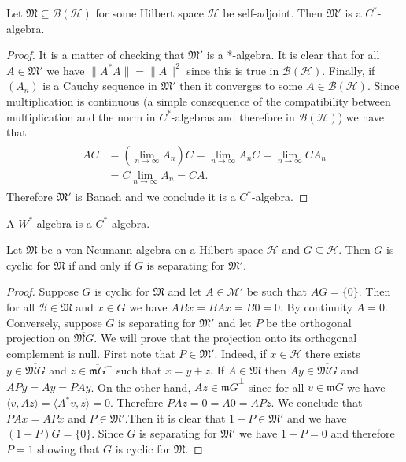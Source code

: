 \begin{theorem}
Let $\mathfrak{M}\subseteq \mathcal{B}({\mathcal{H}})$ for some Hilbert space $\mathcal{H}$ be self-adjoint. Then $\mathfrak{M}'$ is a $C^*$-algebra.
\end{theorem}

\begin{proof}
It is a matter of checking that $\mathfrak{M}'$ is a *-algebra. It is clear that for all $A\in\mathfrak{M}'$ we have $\|A^*A\|=\|A\|^2$ since this is true in $\mathcal{B}(\mathcal{H})$. Finally, if $(A_n)$ is a Cauchy sequence in $\mathfrak{M}'$ then it converges to some $A\in\mathcal{B}(\mathcal{H})$. Since multiplication is continuous (a simple consequence of the compatibility between multiplication and the norm in $C^*$-algebras and therefore in $\mathcal{B}(\mathcal{H})$) we have that
\begin{align}
\begin{split}
AC&=(\lim_{n\rightarrow\infty}A_n)C = \lim_{n\rightarrow\infty}A_nC=\lim_{n\rightarrow\infty}CA_n \\
&= C\lim_{n\rightarrow\infty}A_n=CA.
\end{split}
\end{align}
Therefore $\mathfrak{M}'$ is Banach and we conclude it is a $C^*$-algebra.
\end{proof}

\begin{corollary}\label{cor:W_C}
A $W^*$-algebra is a $C^*$-algebra.
\end{corollary}

\begin{theorem}
Let $\mathfrak{M}$ be a von Neumann algebra on a Hilbert space $\mathcal{H}$ and $G\subseteq\mathcal{H}$. Then $G$ is cyclic for $\mathfrak{M}$ if and only if $G$ is separating for $\mathfrak{M}'$.
\end{theorem}

\begin{proof}
Suppose $G$ is cyclic for $\mathfrak{M}$ and let $A\in\mathcal{M}'$ be such that $AG=\{0\}$. Then for all $\mathcal{B}\in\mathfrak{M}$ and $x\in G$ we have $ABx=BAx=B0=0$. By continuity $A=0$.
Conversely, suppose $G$ is separating for $\mathfrak{M}'$ and let $P$ be the orthogonal projection on $\overline{\mathfrak{M}G}$. We will prove that the projection onto its orthogonal complement is null. First note that $P\in\mathfrak{M}'$. Indeed, if $x\in\mathcal{H}$ there exists $y\in \overline{\mathfrak{M}G}$ and $z\in\overline{\mathfrak{m}G}^\bot$ such that $x=y+z$. If $A\in\mathfrak{M}$ then $Ay\in\overline{\mathfrak{M}G}$ and $APy=Ay=PAy$. On the other hand, $Az\in\overline{\mathfrak{m}G}^\bot$ since for all $v\in\overline{\mathfrak{m}G}$ we have $\langle v,Az\rangle=\langle A^*v,z\rangle=0$. Therefore $PAz=0=A0=APz$. We conclude that $PAx=APx$ and $P\in\mathfrak{M}'$.Then it is clear that $1-P\in\mathfrak{M}'$ and we have $(1-P)G=\{0\}$. Since $G$ is separating for $\mathfrak{M}'$ we have $1-P=0$ and therefore $P=1$ showing that $G$ is cyclic for $\mathfrak{M}$.
\end{proof}

